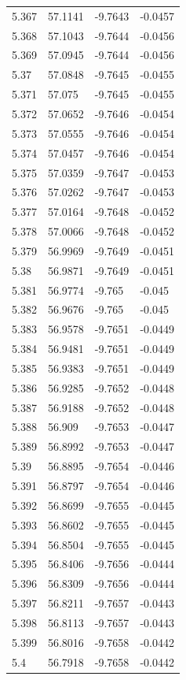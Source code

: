 \begin{tabular}{llll}
5.367 & 57.1141 & -9.7643 & -0.0457 \\
5.368 & 57.1043 & -9.7644 & -0.0456 \\
5.369 & 57.0945 & -9.7644 & -0.0456 \\
5.37 & 57.0848 & -9.7645 & -0.0455 \\
5.371 & 57.075 & -9.7645 & -0.0455 \\
5.372 & 57.0652 & -9.7646 & -0.0454 \\
5.373 & 57.0555 & -9.7646 & -0.0454 \\
5.374 & 57.0457 & -9.7646 & -0.0454 \\
5.375 & 57.0359 & -9.7647 & -0.0453 \\
5.376 & 57.0262 & -9.7647 & -0.0453 \\
5.377 & 57.0164 & -9.7648 & -0.0452 \\
5.378 & 57.0066 & -9.7648 & -0.0452 \\
5.379 & 56.9969 & -9.7649 & -0.0451 \\
5.38 & 56.9871 & -9.7649 & -0.0451 \\
5.381 & 56.9774 & -9.765 & -0.045 \\
5.382 & 56.9676 & -9.765 & -0.045 \\
5.383 & 56.9578 & -9.7651 & -0.0449 \\
5.384 & 56.9481 & -9.7651 & -0.0449 \\
5.385 & 56.9383 & -9.7651 & -0.0449 \\
5.386 & 56.9285 & -9.7652 & -0.0448 \\
5.387 & 56.9188 & -9.7652 & -0.0448 \\
5.388 & 56.909 & -9.7653 & -0.0447 \\
5.389 & 56.8992 & -9.7653 & -0.0447 \\
5.39 & 56.8895 & -9.7654 & -0.0446 \\
5.391 & 56.8797 & -9.7654 & -0.0446 \\
5.392 & 56.8699 & -9.7655 & -0.0445 \\
5.393 & 56.8602 & -9.7655 & -0.0445 \\
5.394 & 56.8504 & -9.7655 & -0.0445 \\
5.395 & 56.8406 & -9.7656 & -0.0444 \\
5.396 & 56.8309 & -9.7656 & -0.0444 \\
5.397 & 56.8211 & -9.7657 & -0.0443 \\
5.398 & 56.8113 & -9.7657 & -0.0443 \\
5.399 & 56.8016 & -9.7658 & -0.0442 \\
5.4 & 56.7918 & -9.7658 & -0.0442 \\

\end{tabular}

